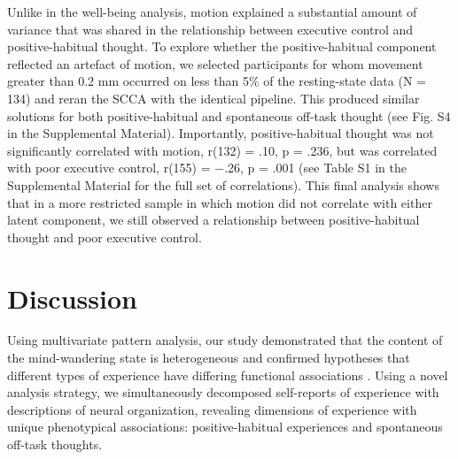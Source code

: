 Unlike in the well-being analysis, motion explained a substantial amount of variance that was shared in the relationship between executive control and positive-habitual thought. To explore whether the positive-habitual component reflected an artefact of motion, we selected participants for whom movement greater than 0.2 mm occurred on less than 5\% of the resting-state data (N = 134) and reran the SCCA with the identical pipeline. This produced similar solutions for both positive-habitual and spontaneous off-task thought (see Fig. S4 in the Supplemental Material). Importantly, positive-habitual thought was not significantly correlated with motion, r(132) = .10, p = .236, but was correlated with poor executive control, r(155) = −.26, p = .001 (see Table S1 in the Supplemental Material for the full set of correlations). This final analysis shows that in a more restricted sample in which motion did not correlate with either latent component, we still observed a relationship between positive-habitual thought and poor executive control.

\section{Discussion}
\label{study1:discussion}
Using multivariate pattern analysis, our study demonstrated that the content of the mind-wandering state is heterogeneous and confirmed hypotheses that different types of experience have differing functional associations \cite{Smallwood2013a}. 
Using a novel analysis strategy, we simultaneously decomposed self-reports of experience with descriptions of neural organization, revealing dimensions of experience with unique phenotypical associations: positive-habitual experiences and spontaneous off-task thoughts.

